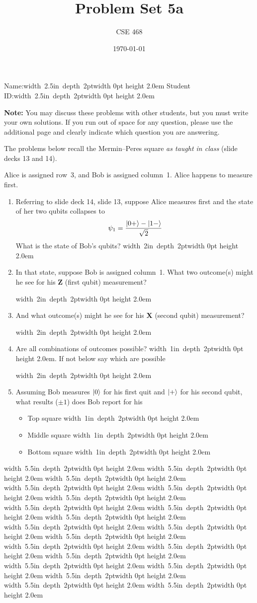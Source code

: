 \documentclass[12pt]{article}
\title{Problem Set 5a}
\author{CSE 468}
\date{\today}
\newcommand{\Blank}[1][1in]{\mbox{\hskip 4pt\vrule width #1 depth 2pt}\vrule width 0pt height 2.0em}
\newcommand{\NameBlank}{\mbox{\hskip 4pt\vrule width 2.5in depth 2pt}\vrule width 0pt height 2.0em}
\newcommand{\BlankLine}{\mbox{\hskip 4pt\vrule width 5.5in depth 2pt}\vrule width 0pt height 2.0em}
\begin{document}
\maketitle

\noindent Name:\NameBlank{} \newline
\noindent Student ID:\NameBlank{} \newline

\textbf{Note:} You may discuss these problems with other students, but you must write your own solutions. If you run out of space for any question, please use the additional page and clearly indicate which question you are answering.

\bigskip

The problems below recall the Mermin--Peres square \emph{as taught in class} (slide decks 13 and 14).

Alice is assigned row~3, and Bob is assigned column~1.  Alice happens to measure first.
\begin{enumerate}[font=\bfseries]
    \item Referring to slide deck 14, slide 13, suppose Alice measures first and the state of her two qubits collapses to \[ \psi_{1}=\frac{\ket{0+}-\ket{1-}}{\sqrt{2}} \]
    What is the state of Bob's qubits? \Blank[2in]
    \clearpage
    \item In that state, suppose Bob is assigned column~1.  What two outcome(s) might he see for his \textbf{Z} (first qubit) measurement?
    
    \Blank[2in]
    \item And what outcome(s) might he see for his \textbf{X} (second qubit) measurement?
    
    \Blank[2in]
    
    \item Are all combinations of outcomes possible?  \Blank{}.  If not below say which are possible
    
    \Blank[2in]{}
    \item Assuming Bob measures $\ket{0}$ for his first quit and $\ket{+}$ for his second qubit, what results ($\pm 1$) does Bob report for his
    \begin{itemize}
        \item Top square \Blank{}
        \item Middle square \Blank{}
        \item Bottom square \Blank{}
    \end{itemize}
    
\end{enumerate}
\newpage
\noindent \BlankLine{}
\BlankLine{}
\BlankLine{}
\BlankLine{}
\BlankLine{}
\BlankLine{}
\BlankLine{}
\BlankLine{}
\BlankLine{}
\BlankLine{}
\BlankLine{}
\BlankLine{}
\BlankLine{}
\BlankLine{}
\BlankLine{}
\BlankLine{}
\BlankLine{}
\BlankLine{}
\BlankLine{}
\BlankLine{}
\end{document}
